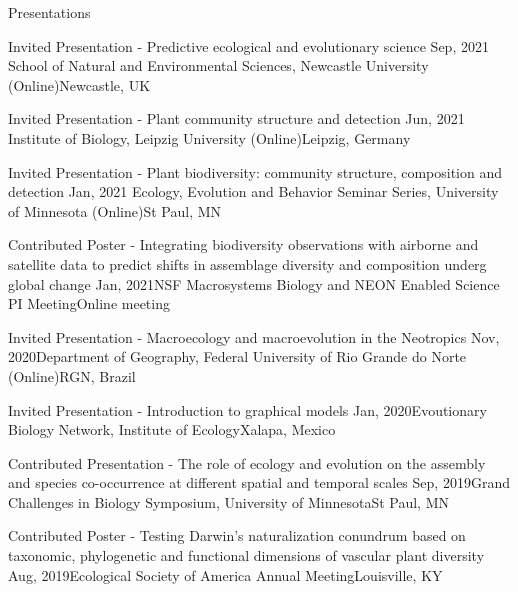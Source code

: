 \documentclass{resume} %
\begin{document}
\begin{rSection}{Presentations}
\begin{sSubsection}{Invited Presentation - Predictive ecological and evolutionary science}{ }{Sep, 2021}{ School of Natural and Environmental Sciences, Newcastle University (Online)}{Newcastle, UK}
\end{sSubsection}

\begin{sSubsection}{Invited Presentation - Plant community structure and detection}{ }{Jun, 2021}{ Institute of Biology, Leipzig University (Online)}{Leipzig, Germany}
\end{sSubsection}

\begin{sSubsection}{Invited Presentation - Plant biodiversity: community structure, composition and detection}{ }{Jan, 2021}{ Ecology, Evolution and Behavior Seminar Series, University of Minnesota (Online)}{St Paul, MN}
\end{sSubsection}

\begin{sSubsection}{Contributed Poster - Integrating biodiversity observations with airborne and satellite data to predict shifts in assemblage diversity and composition underg global change}{ }{Jan, 2021}{NSF Macrosystems Biology and NEON Enabled Science PI Meeting}{Online meeting}
\end{sSubsection}

\begin{sSubsection}{Invited Presentation - Macroecology and macroevolution in the Neotropics}{ }{Nov, 2020}{Department of Geography, Federal University of Rio Grande do Norte (Online)}{RGN, Brazil}
\end{sSubsection}

\begin{sSubsection}{Invited Presentation - Introduction to graphical models}{ }{Jan, 2020}{Evoutionary Biology Network, Institute of Ecology}{Xalapa, Mexico}
\end{sSubsection}

\begin{sSubsection}{Contributed Presentation - The role of ecology and evolution on the assembly and species co-occurrence at different spatial and temporal scales}{ }{Sep, 2019}{Grand Challenges in Biology Symposium, University of Minnesota}{St Paul, MN}
\end{sSubsection}

\begin{sSubsection}{Contributed Poster - Testing Darwin's naturalization conundrum based on taxonomic, phylogenetic and functional dimensions of vascular plant diversity}{ }{Aug, 2019}{Ecological Society of America Annual Meeting}{Louisville, KY}
\end{sSubsection}


\end{rSection}
\end{document}
